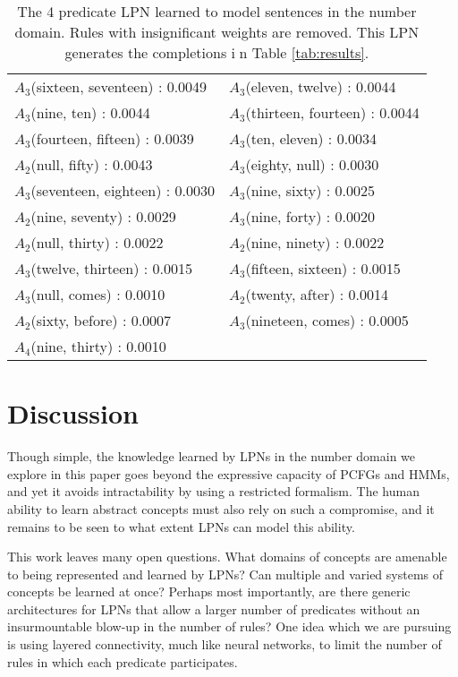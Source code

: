 \documentclass[10pt, twocolumn]{article}
\begin{document}
\begin{table}[t]
\begin{tabular}{>{\tiny} l >{\tiny} l}
$A_3$(sixteen, seventeen) : 0.0049 &
$A_3$(eleven, twelve) : 0.0044 \\
$A_3$(nine, ten) : 0.0044 &
$A_3$(thirteen, fourteen) : 0.0044 \\
$A_3$(fourteen, fifteen) : 0.0039 &
$A_3$(ten, eleven) : 0.0034 \\
$A_2$(null, fifty) : 0.0043 &
$A_3$(eighty, null) : 0.0030 \\
$A_3$(seventeen, eighteen) : 0.0030 &
$A_3$(nine, sixty) : 0.0025 \\
$A_2$(nine, seventy) : 0.0029 &
$A_3$(nine, forty) : 0.0020 \\
$A_2$(null, thirty) : 0.0022 &
$A_2$(nine, ninety) : 0.0022 \\
$A_3$(twelve, thirteen) : 0.0015 &
$A_3$(fifteen, sixteen) : 0.0015 \\
$A_3$(null, comes) : 0.0010 &
$A_2$(twenty, after) : 0.0014 \\
$A_2$(sixty, before) : 0.0007 &
$A_3$(nineteen, comes) : 0.0005 \\
$A_4$(nine, thirty) : 0.0010 & \\
\end{tabular}
\caption{The 4 predicate LPN learned to model sentences in the number domain. Rules with insignificant weights are removed. This LPN generates the completions in Table \ref{tab:results}.}
\label{tab:grammar}
\end{table}

\vspace{-1em}
\section{Discussion}

Though simple, the knowledge learned by LPNs in the number
domain we explore in this paper goes beyond the expressive capacity of
PCFGs and HMMs, and yet it avoids intractability by using a restricted
formalism. The human ability to learn abstract concepts must also rely
on such a compromise, and it remains to be seen to what extent LPNs
can model this ability.

This work leaves many open questions. What domains of concepts are
amenable to being represented and learned by LPNs? Can multiple and
varied systems of concepts be learned at once? Perhaps most
importantly, are there generic architectures for LPNs that allow a
larger number of predicates without an insurmountable blow-up in the
number of rules? One idea which we are pursuing is using layered
connectivity, much like neural networks, to limit the number of rules
in which each predicate participates. 
\end{document}
